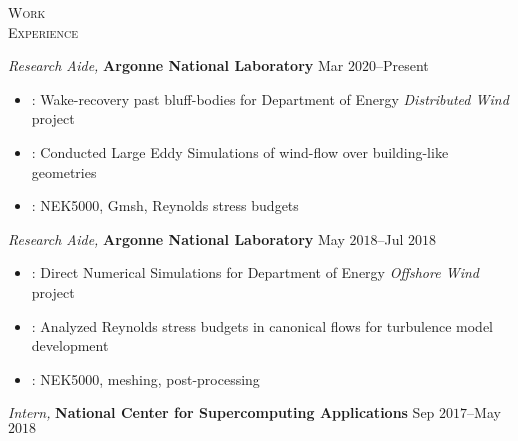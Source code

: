 \documentclass[10pt]{article}
\begin{document}
\vspace{-1.5em}
\begin{multicols}{2}
\textsc{Work \\ Experience}
\columnbreak

\textit{Research Aide,} \textbf{Argonne National Laboratory} \hfill Mar $2020$--Present

\vspace{-1.75em}
\begin{itemize}[label=-]
    \setlength\itemsep{-0.25em}
    \setlength{\itemindent}{-1.50em}
    \item {}: Wake-recovery past bluff-bodies for Department of Energy \textit{Distributed Wind} project
    \item {}: Conducted Large Eddy Simulations of wind-flow over building-like geometries
    \item {}: {NEK5000}, {Gmsh}, Reynolds stress budgets
\end{itemize}
\vspace{-2.0em}

\vspace{0.5em}
%
\textit{Research Aide,} \textbf{Argonne National Laboratory} \hfill May $2018$--Jul $2018$

\vspace{-1.75em}
\begin{itemize}[label=-]
    \setlength\itemsep{-0.25em}
    \setlength{\itemindent}{-1.50em}
    \item {}: Direct Numerical Simulations for Department of Energy \textit{Offshore Wind} project
    \item {}: Analyzed Reynolds stress budgets in canonical flows for turbulence model development
    \item {}: {NEK5000}, meshing, post-processing
\end{itemize}
\vspace{-2.0em}

\vspace{0.5em}
%
\textit{Intern,} \textbf{National Center for Supercomputing Applications} \hfill Sep $2017$--May $2018$


\end{multicols}
\end{document}
